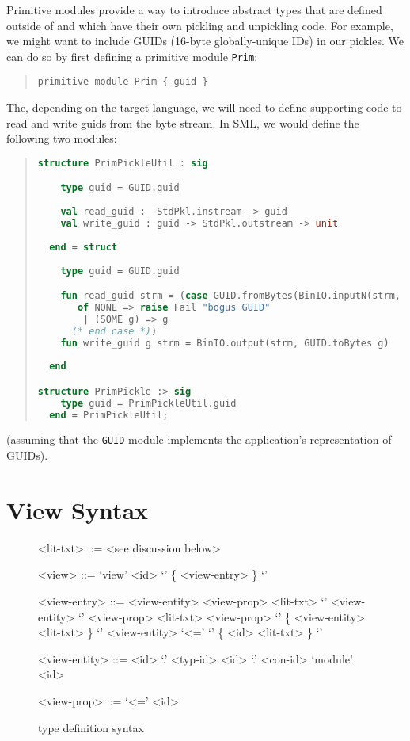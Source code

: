 Primitive modules provide a way to introduce abstract types that are defined outside
of \asdl{} and which have their own pickling and unpickling code.
For example, we might want to include GUIDs (16-byte globally-unique IDs) in our
pickles.
We can do so by first defining a primitive module \lstinline!Prim!:
\begin{quote}\begin{lstlisting}[language=ASDL]
primitive module Prim { guid }
\end{lstlisting}\end{quote}%
The, depending on the target language, we will need to define
supporting code to read and write guids from the byte stream.
In SML, we would define the following two modules:
\begin{quote}\begin{lstlisting}[language=SML]
structure PrimPickleUtil : sig

    type guid = GUID.guid
    
    val read_guid :  StdPkl.instream -> guid
    val write_guid : guid -> StdPkl.outstream -> unit
    
  end = struct
  
    type guid = GUID.guid

    fun read_guid strm = (case GUID.fromBytes(BinIO.inputN(strm, 16))
	   of NONE => raise Fail "bogus GUID"
	    | (SOME g) => g
	  (* end case *))
    fun write_guid g strm = BinIO.output(strm, GUID.toBytes g)
    
  end

structure PrimPickle :> sig
    type guid = PrimPickleUtil.guid
  end = PrimPickleUtil;
\end{lstlisting}\end{quote}%
(assuming that the \lstinline!GUID! module implements the application's representation
of GUIDs).

\section{View Syntax}
\begin{figure}[ht]
  \begin{center}
    \begin{grammar}
      <lit-txt>     ::= <see discussion below>

      <view>        ::= `view' <id> `{' \{ <view-entry> \} `}'

      <view-entry>  ::= <view-entity>  <view-prop> <lit-txt>
		 \alt{} `{' {<view-entity>} `}' <view-prop> <lit-txt>
		 \alt{} <view-prop> `{' \{ <view-entity> <lit-txt> \} `}'
		 \alt{} <view-entity> `<=' `{' \{ <id> <lit-txt> \} `}'

      <view-entity> ::= <id> `.' <typ-id>
		  `.' <con-id>
		 \alt{} `module' <id>

      <view-prop>   ::= `<='  <id>
    \end{grammar}
  \end{center}
  \caption{\asdl{} type definition syntax}
\end{figure}%

